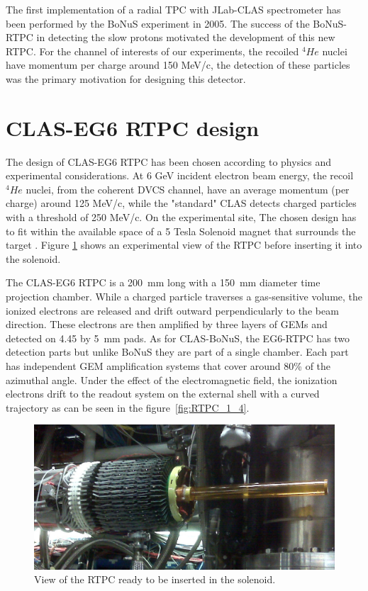 \documentclass[twocolumn,showpacs,superscriptaddress,groupedaddress]{revtex4}
\begin{document}
The first implementation of a radial TPC with JLab-CLAS spectrometer has been 
performed by the BoNuS experiment \cite{BONUS} in 2005. The success of the 
BoNuS-RTPC in detecting the slow protons motivated the development of this new 
RTPC. For the channel of interests of our experiments, the recoiled $^{4}He$ 
nuclei have momentum per charge around 150 MeV/c, the detection of these 
particles was the primary motivation for designing this detector. 

 
\section{CLAS-EG6 RTPC design} \label{sec_design}
The design of CLAS-EG6 RTPC has been chosen according to physics and 
experimental considerations. At 6 GeV incident electron beam energy, the recoil 
$^{4}He$ nuclei, from the coherent DVCS channel, have an average momentum (per 
charge) around 125 MeV/c, while the "standard" CLAS detects charged particles 
with a threshold of 250 MeV/c. On the experimental site, The chosen design has 
to fit within the available space of a 5 Tesla Solenoid magnet that surrounds 
the target \cite{Hyon-suk}. Figure \ref{fig:RTPC2} shows an experimental view 
of the RTPC before inserting it into the solenoid. 


The CLAS-EG6 RTPC is a 200~mm long with a 150~mm diameter time projection 
chamber. While a charged particle traverses a gas-sensitive volume, the ionized 
electrons are released and drift outward perpendicularly to the beam direction.  
These electrons are then amplified by three layers of GEMs and detected on 4.45 
by 5~mm pads. As for CLAS-BoNuS, the EG6-RTPC has two detection parts but 
unlike BoNuS they are part of a single chamber. Each part has independent GEM 
amplification systems that cover around 80\% of the azimuthal angle. Under the 
effect of the electromagnetic field, the ionization electrons drift to the 
readout system on the external shell with a curved trajectory as can be seen in 
the figure~\ref{fig:RTPC_1_4}.

\begin{figure}[tb]
\centering
\includegraphics[scale=0.19]{fig/RTPC_exp.png}
\caption{View of the RTPC ready to be inserted in the solenoid. } 
\label{fig:RTPC2}
\end{figure}
\end{document}
